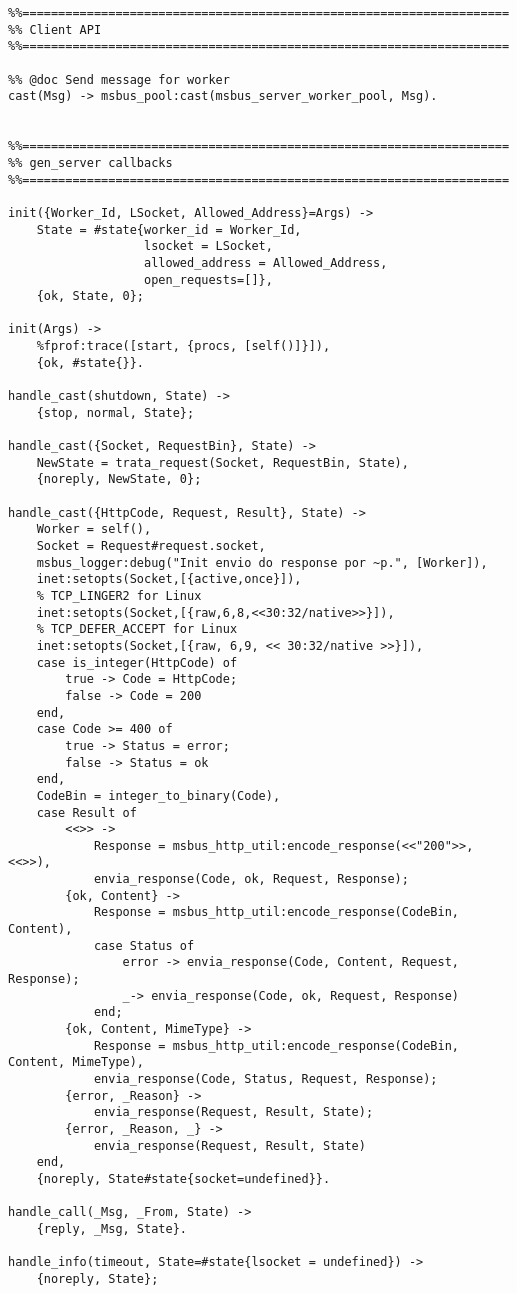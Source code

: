 \begin{lstlisting}
%%====================================================================
%% Client API
%%====================================================================

%% @doc Send message for worker
cast(Msg) -> msbus_pool:cast(msbus_server_worker_pool, Msg).


%%====================================================================
%% gen_server callbacks
%%====================================================================

init({Worker_Id, LSocket, Allowed_Address}=Args) ->
    State = #state{worker_id = Worker_Id, 
				   lsocket = LSocket, 
				   allowed_address = Allowed_Address,
				   open_requests=[]},
    {ok, State, 0};

init(Args) ->
    %fprof:trace([start, {procs, [self()]}]),
    {ok, #state{}}.

handle_cast(shutdown, State) ->
    {stop, normal, State};

handle_cast({Socket, RequestBin}, State) ->
	NewState = trata_request(Socket, RequestBin, State),
	{noreply, NewState, 0};
	
handle_cast({HttpCode, Request, Result}, State) ->
	Worker = self(),
	Socket = Request#request.socket,
	msbus_logger:debug("Init envio do response por ~p.", [Worker]),
	inet:setopts(Socket,[{active,once}]),
	% TCP_LINGER2 for Linux
	inet:setopts(Socket,[{raw,6,8,<<30:32/native>>}]),
	% TCP_DEFER_ACCEPT for Linux
	inet:setopts(Socket,[{raw, 6,9, << 30:32/native >>}]),
	case is_integer(HttpCode) of
		true -> Code = HttpCode;
		false -> Code = 200
	end,
	case Code >= 400 of
		true -> Status = error;
		false -> Status = ok
	end,
	CodeBin = integer_to_binary(Code), 
	case Result of
		<<>> -> 
			Response = msbus_http_util:encode_response(<<"200">>, <<>>),
			envia_response(Code, ok, Request, Response);
		{ok, Content} -> 
			Response = msbus_http_util:encode_response(CodeBin, Content),
			case Status of
				error -> envia_response(Code, Content, Request, Response);
				_-> envia_response(Code, ok, Request, Response)
			end;
		{ok, Content, MimeType} -> 
			Response = msbus_http_util:encode_response(CodeBin, Content, MimeType),
			envia_response(Code, Status, Request, Response);
		{error, _Reason} -> 
			envia_response(Request, Result, State);
		{error, _Reason, _} -> 
			envia_response(Request, Result, State)
	end,
	{noreply, State#state{socket=undefined}}.

handle_call(_Msg, _From, State) ->
	{reply, _Msg, State}.

handle_info(timeout, State=#state{lsocket = undefined}) ->
	{noreply, State};


\end{lstlisting}
